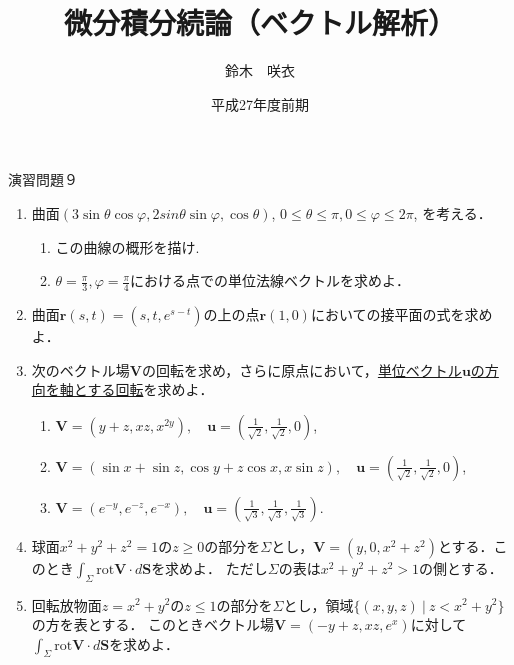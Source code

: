 \documentclass{jarticle}
\begin{document}
\title{微分積分続論（ベクトル解析）} 
\author{鈴木　咲衣}
\date{平成27年度前期}
\maketitle

\begin{center} {\Large 演習問題９ } \end{center}
\begin{enumerate}
\item \cite[章末問題2.9]{koba}
曲面$(3 \sin \theta \cos \varphi, 2sin \theta \sin \varphi, \cos \theta )$, $0\leq \theta \leq \pi, 0\leq \varphi \leq 2\pi$, を考える．
\begin{enumerate}
\item この曲線の概形を描け.
\item $\theta=\frac{\pi}{3}, \varphi=\frac{\pi}{4}$における点での単位法線ベクトルを求めよ．
\end{enumerate} 
\item \cite[問題2.48]{koba} 
曲面$\bm r(s,t)=(s,t, e^{s-t})$の上の点$\bm r(1,0)$においての接平面の式を求めよ．
\item \cite[問題7.12]{koba} 
次のベクトル場$\bm V$の回転を求め，さらに原点において，\underline{単位ベクトル$\bm u$の方向を軸とする回転}を求めよ．
\begin{enumerate}
\item $\bm V=(y+z, xz, x^{2y}), \quad \bm u=(\frac{1}{\sqrt {2}}, \frac{1}{\sqrt {2}}, 0)$,
\item$\bm V=(\sin x+\sin z, \cos y+z\cos x, x\sin z), \quad \bm u=(\frac{1}{\sqrt {2}}, \frac{1}{\sqrt {2}}, 0)$,
\item $\bm V=(e^{-y}, e^{-z}, e^{-x}), \quad \bm u=(\frac{1}{\sqrt {3}}, \frac{1}{\sqrt {3}}, \frac{1}{\sqrt {3}})$.
\end{enumerate} 

\item \cite[問題8.16]{koba} 
球面$x^{2}+y^{2}+z^{2}=1$の$z\geq 0$の部分を$\Sigma$とし，$\bm V=(y, 0, x^{2}+z^{2})$とする．このとき$\int_{\Sigma}\mathrm{rot} \bm V \cdot d\bm S$を求めよ．
ただし$\Sigma$の表は$x^{2}+y^{2}+z^{2}>1$の側とする．
\item \cite[章末問題8.9]{koba} 
回転放物面$z=x^{2}+y^{2}$の$z\leq 1$の部分を$\Sigma$とし，領域$\{(x,y,z) \ | \ z<  x^{2}+y^{2}\}$の方を表とする．
このときベクトル場$\bm V=(-y+z, xz, e^{x})$に対して$\int_{\Sigma} \mathrm{rot} \bm V \cdot d\bm S$を求めよ．
\end{enumerate}
\newpage
\end{document}
